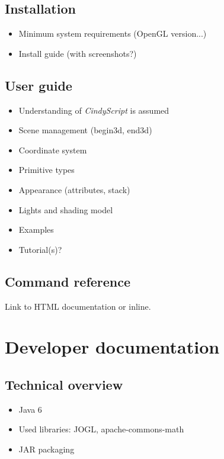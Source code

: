 \documentclass{scrreprt}
\begin{document}
\section{Installation}

\begin{itemize}
\item Minimum system requirements (OpenGL version...)
\item Install guide (with screenshots?)
\end{itemize}

\section{User guide}

\begin{itemize}
\item Understanding of \emph{CindyScript} is assumed
\item Scene management (begin3d, end3d)
\item Coordinate system
\item Primitive types
\item Appearance (attributes, stack)
\item Lights and shading model
\item Examples
\item Tutorial(s)?
\end{itemize}

\section{Command reference}

Link to HTML documentation or inline.


\chapter{Developer documentation}

\section{Technical overview}

\begin{itemize}
\item Java 6
\item Used libraries: JOGL, apache-commons-math
\item JAR packaging
\end{itemize}
\end{document}
